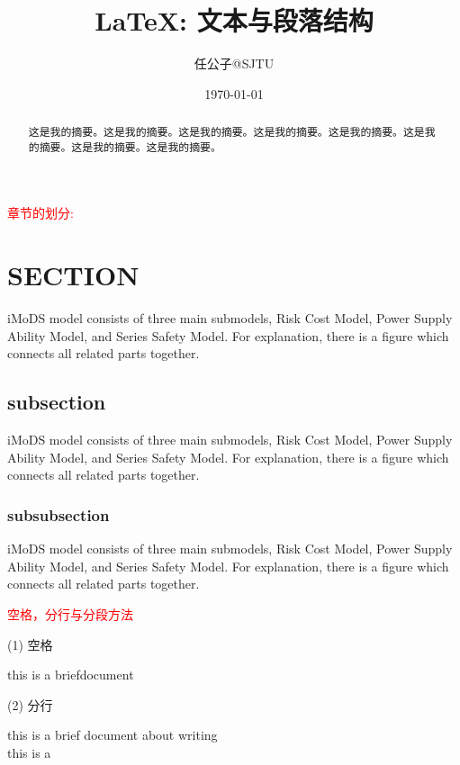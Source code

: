 \documentclass[12pt, a4paper, onecolumn]{elegantpaper}  %
\title{\LaTeX : 文本与段落结构}
\author{任公子@SJTU}
\date{}
\date{\today}  %
\begin{document}
 
\maketitle  %

\begin{abstract}
这是我的摘要。这是我的摘要。这是我的摘要。这是我的摘要。这是我的摘要。这是我的摘要。这是我的摘要。这是我的摘要。

\end{abstract}



\newpage 

\tableofcontents %
\newpage

\textcolor{red}{\Huge{章节的划分:}}

\section{SECTION}
iMoDS model consists of three main submodels, Risk Cost Model, Power Supply Ability Model, and Series Safety Model. For explanation, there is a figure which connects all related parts together.

\subsection{subsection}
iMoDS model consists of three main submodels, Risk Cost Model, Power Supply Ability Model, and Series Safety Model. For explanation, there is a figure which connects all related parts together.

\subsubsection{subsubsection}
iMoDS model consists of three main submodels, Risk Cost Model, Power Supply Ability Model, and Series Safety Model. For explanation, there is a figure which connects all related parts together.


\textcolor{red}{\Huge{空格，分行与分段方法}}

(1) 空格

this is a brief\quad document


(2) 分行

this is a brief document about writing \\ this is a 
\end{document}
